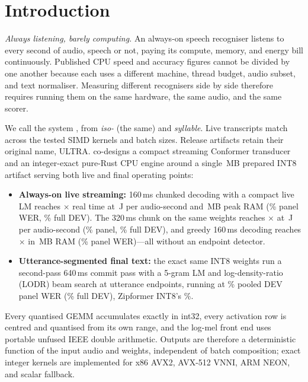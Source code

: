 \section{Introduction}\label{sec:intro}

\emph{Always listening, barely computing.} An always-on speech recogniser listens to every second of
audio, speech or not, paying its compute, memory, and energy bill continuously. Published CPU speed
and accuracy figures cannot be divided by one another because each uses a different machine, thread
budget, audio subset, and text normaliser. Measuring different recognisers side by side therefore
requires running them on the same hardware, the same audio, and the same scorer.

%
 We call the system \ultra{}, from \emph{iso-} (the same) and \emph{syllable}.
Live transcripts match across the tested SIMD kernels and batch sizes. Release artifacts retain their
original name, ULTRA. \ultra{} co-designs a compact streaming Conformer transducer and an
integer-exact pure-Rust CPU engine around a single \ColdHeadModel\,MB prepared INT8 artifact serving both live and
final operating points:
\begin{itemize}
\item \textbf{Always-on live streaming:} 160\,ms chunked decoding with a compact live LM reaches
  \ColdLiveSpeed$\times$ real time at \ColdLiveWatts\,J per audio-second and \ColdLiveRss\,MB peak RAM
  (\ColdLiveWer\% panel WER, \CandLiveLmFullWer\% full DEV). The 320\,ms chunk on the same weights
  reaches \VsWideSpeed$\times$ at \VsWideWatts\,J per audio-second (\VsWideWer\% panel,
  \CandLiveLmEightFullWer\% full DEV), and greedy 160\,ms decoding reaches \VsGreedySpeed$\times$ in
  \ColdRcTwoLiveGreedyRss\,MB RAM (\VsGreedyWer\% panel WER)---all without an endpoint detector.
\item \textbf{Utterance-segmented final text:} the exact same INT8 weights run a second-pass 640\,ms
  commit pass with a 5-gram LM and log-density-ratio (LODR) beam search at utterance endpoints,
  running \ColdFinalVsZipSpeed{} at \ColdHeadWer\% pooled DEV panel WER (\CandFinalFullWer\% full DEV),
  \VsVerdictTwo{} Zipformer INT8's \ColdZipWer\%.
\end{itemize}

 Every quantised GEMM accumulates exactly in int32, every activation row
is centred and quantised from its own range, and the log-mel front end uses portable unfused IEEE
double arithmetic. Outputs are therefore a deterministic function of the input audio and weights,
independent of batch composition; exact integer kernels are implemented for x86 AVX2, AVX-512 VNNI,
ARM NEON, and scalar fallback.

